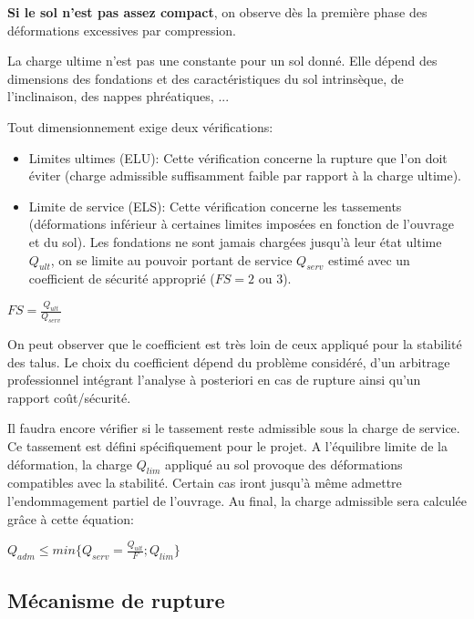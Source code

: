    \textbf{Si le sol n'est pas assez compact}, on observe dès la première phase des déformations excessives par compression.
    
    La charge ultime n'est pas une constante pour un sol donné. Elle dépend des dimensions des fondations et des caractéristiques du sol intrinsèque, de l'inclinaison, des nappes phréatiques, ...
    
    Tout dimensionnement exige deux vérifications:
    \begin{itemize}
        \item Limites ultimes (ELU): Cette vérification concerne la rupture que l'on doit éviter (charge admissible suffisamment faible par rapport à la charge ultime).
        \item Limite de service (ELS): Cette vérification concerne les tassements (déformations inférieur à certaines limites imposées en fonction de l'ouvrage et du sol). Les fondations ne sont jamais chargées jusqu'à leur état ultime $Q_{ult}$, on se limite au pouvoir portant de service $Q_{serv}$ estimé avec un coefficient de sécurité approprié ($FS = 2$ ou $3$).
    \end{itemize}
    
    \begin{center}
        $FS = \frac{Q_{ult}}{Q_{serv}}$
    \end{center}
    
    On peut observer que le coefficient est très loin de ceux appliqué pour la stabilité des talus. Le choix du coefficient dépend du problème considéré, d'un arbitrage professionnel intégrant l'analyse à posteriori en cas de rupture ainsi qu'un rapport coût/sécurité.
    
    Il faudra encore vérifier si le tassement reste admissible sous la charge de service. Ce tassement est défini spécifiquement pour le projet. A l'équilibre limite de la déformation, la charge $Q_{lim}$ appliqué au sol provoque des déformations compatibles avec la stabilité. Certain cas iront jusqu'à même admettre l'endommagement partiel de l'ouvrage. Au final, la charge admissible sera calculée grâce à cette équation:
    
    \begin{center}
        $Q_{adm} \le min \{Q_{serv} = \frac{Q_{ult}}{F}; Q_{lim}\}$
    \end{center}
    
    \subsection{Mécanisme de rupture}
    
